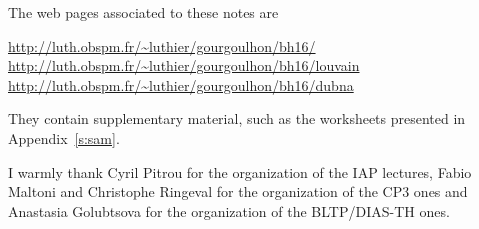 The web pages associated to these notes are
\begin{center}
\url{http://luth.obspm.fr/~luthier/gourgoulhon/bh16/}\\
\url{http://luth.obspm.fr/~luthier/gourgoulhon/bh16/louvain}\\
\url{http://luth.obspm.fr/~luthier/gourgoulhon/bh16/dubna}
\end{center}
They contain supplementary material, such as the worksheets presented in
Appendix~\ref{s:sam}.

\vspace{2ex}

I warmly thank Cyril Pitrou for the organization of the IAP lectures,
Fabio Maltoni and Christophe Ringeval for the organization of the CP3 ones
and Anastasia Golubtsova for the organization of the BLTP/DIAS-TH ones.
